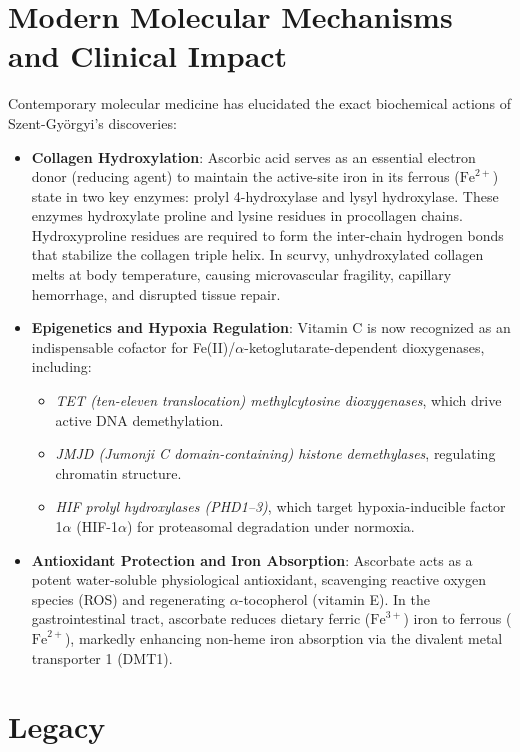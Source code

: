 \section{Modern Molecular Mechanisms and Clinical Impact}

Contemporary molecular medicine has elucidated the exact biochemical actions of Szent-Györgyi's discoveries:
\begin{itemize}
    \item \textbf{Collagen Hydroxylation}: Ascorbic acid serves as an essential electron donor (reducing agent) to maintain the active-site iron in its ferrous ($\text{Fe}^{2+}$) state in two key enzymes: prolyl 4-hydroxylase and lysyl hydroxylase. These enzymes hydroxylate proline and lysine residues in procollagen chains. Hydroxyproline residues are required to form the inter-chain hydrogen bonds that stabilize the collagen triple helix. In scurvy, unhydroxylated collagen melts at body temperature, causing microvascular fragility, capillary hemorrhage, and disrupted tissue repair.
    \item \textbf{Epigenetics and Hypoxia Regulation}: Vitamin C is now recognized as an indispensable cofactor for Fe(II)/$\alpha$-ketoglutarate-dependent dioxygenases, including:
      \begin{itemize}
          \item \emph{TET (ten-eleven translocation) methylcytosine dioxygenases}, which drive active DNA demethylation.
          \item \emph{JMJD (Jumonji C domain-containing) histone demethylases}, regulating chromatin structure.
          \item \emph{HIF prolyl hydroxylases (PHD1--3)}, which target hypoxia-inducible factor 1$\alpha$ (HIF-1$\alpha$) for proteasomal degradation under normoxia.
      \end{itemize}
    \item \textbf{Antioxidant Protection and Iron Absorption}: Ascorbate acts as a potent water-soluble physiological antioxidant, scavenging reactive oxygen species (ROS) and regenerating $\alpha$-tocopherol (vitamin E). In the gastrointestinal tract, ascorbate reduces dietary ferric ($\text{Fe}^{3+}$) iron to ferrous ($\text{Fe}^{2+}$), markedly enhancing non-heme iron absorption via the divalent metal transporter 1 (DMT1).
\end{itemize}

\section{Legacy}

